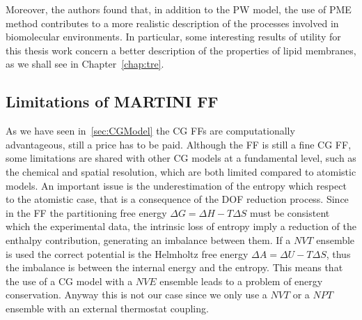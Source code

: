 Moreover, the authors found that, in addition to the \ac{PW} model, the use of \ac{PME} method contributes to a
more realistic description of the processes involved in biomolecular environments. In particular, some
interesting results of utility for this thesis work concern a better description of the properties of lipid
membranes, as we shall see in Chapter~\ref{chap:tre}.

\subsection{Limitations of MARTINI FF}
As we have seen in~\ref{sec:CGModel} the \ac{CG} \acp{FF} are computationally advantageous, still a price has to
be paid. Although the \martini \ac{FF} is still a fine \ac{CG} \ac{FF}, some limitations are shared with other
\ac{CG} models at a fundamental level, such as the chemical and spatial resolution, which are both limited
compared to atomistic models. An important issue is the underestimation of the entropy which respect to the
atomistic case, that is a consequence of the \ac{DOF} reduction process. Since in the \martini \ac{FF} the
partitioning free energy $\Delta G = \Delta H - T\Delta S$ must be consistent which the experimental data, the
intrinsic loss of entropy imply a reduction of the enthalpy contribution, generating an imbalance between them.
If a $NVT$ ensemble is used the correct potential is the Helmholtz free energy $\Delta A = \Delta U - T\Delta S$,
thus the imbalance is between the internal energy and the entropy. This means that the use of a \ac{CG} model
with a $NVE$ ensemble leads to a problem of energy conservation. Anyway this is not our case since we only use a
$NVT$ or a $NPT$ ensemble with an external thermostat coupling.

